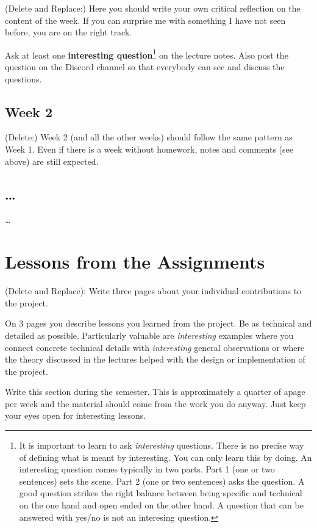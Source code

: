 \documentclass{article}
\theoremstyle{theorem}
\theoremstyle{definition}
\theoremstyle{remark}
\begin{document}
(Delete and Replace:) Here you should write your own critical reflection on the content of the week. If you can surprise me with something I have not seen before, you are on the right track.


Ask at least one \textbf{interesting question}\footnote{It is important to learn to ask \emph{interesting} questions. There is no precise way of defining what is meant by interesting. You can only learn this by doing. An interesting question comes typically in two parts. Part 1 (one or two sentences) sets the scene. Part 2 (one or two sentences) asks the question. A good question strikes the right balance between being specific and technical on the one hand and open ended on the other hand. A question that can be answered with yes/no is not an interesing question.} on the lecture notes. Also post the question on the Discord channel so that everybody can see and discuss the questions.

\subsection{Week 2}

(Delete:) Week 2 (and all the other weeks) should follow the same pattern as Week 1. Even if there is a week without homework, notes and comments (see above) are still expected.

\subsection{\ldots}

\ldots

\section{Lessons from the Assignments}

(Delete and Replace): Write three pages about your individual contributions to the project.

On 3 pages you describe lessons you learned from the project. Be as technical and detailed as possible. Particularly valuable are \emph{interesting} examples where you connect concrete technical details with \emph{interesting} general observations or where the theory discussed in the lectures helped with the design or implementation of the project.

Write this section during the semester. This is approximately a quarter of apage per week and the material should come from the work you do anyway. Just keep your eyes open for interesting lessons.
\end{document}
